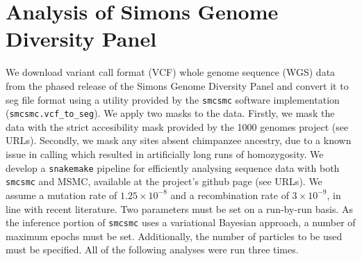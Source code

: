 \documentclass{article}
\begin{document}
\newpage
\setcounter{section}{0}
\renewcommand{\thesection}{S\arabic{section}}%
\setcounter{table}{0}
\renewcommand{\thetable}{S\arabic{table}}%
\setcounter{figure}{0}
\renewcommand{\thefigure}{S\arabic{figure}}%

\section{Analysis of Simons Genome Diversity Panel}

We download variant call format (VCF) whole genome sequence (WGS) data from the phased release of the Simons Genome Diversity Panel and convert it to seg file format using a utility provided by the {\tt smcsmc} software implementation ({\tt smcsmc.vcf\_to\_seg}). We apply two masks to the data. Firstly, we mask the data with the strict accesibility mask provided by the 1000 genomes project (see URLs). Secondly, we mask any sites absent chimpanzee ancestry, due to a known issue in calling which resulted in artificially long runs of homozygosity. We develop a {\tt snakemake} pipeline for efficiently analysing sequence data with both {\tt smcsmc} and MSMC, available at the project's github page (see URLs). We assume a mutation rate of $1.25\times10^{-8}$ and a recombination rate of $3\times10^{-9}$, in line with recent literature. Two parameters must be set on a run-by-run basis. As the inference portion of {\tt smcsmc} uses a variational Bayesian approach, a number of maximum epochs must be set. Additionally, the number of particles to be used must be specified. All of the following analyses were run three times. 
\end{document}
